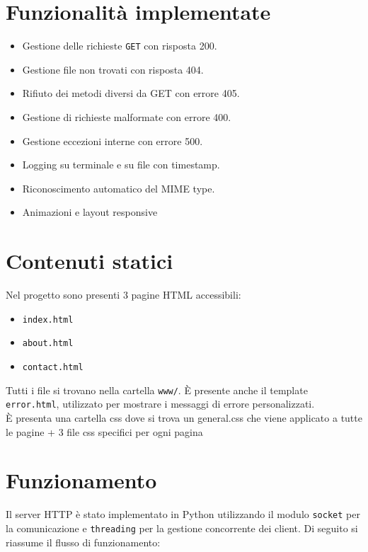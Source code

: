 \documentclass[a4paper,11pt]{article}
\begin{document}
\section*{Funzionalità implementate}
\begin{itemize}
  \item Gestione delle richieste \texttt{GET} con risposta 200.
  \item Gestione file non trovati con risposta 404.
  \item Rifiuto dei metodi diversi da GET con errore 405.
  \item Gestione di richieste malformate con errore 400.
  \item Gestione eccezioni interne con errore 500.
  \item Logging su terminale e su file con timestamp.
  \item Riconoscimento automatico del MIME type.
  \item Animazioni e layout responsive
\end{itemize}

\section*{Contenuti statici}
Nel progetto sono presenti 3 pagine HTML accessibili:
\begin{itemize}
  \item \texttt{index.html}
  \item \texttt{about.html}
  \item \texttt{contact.html}
\end{itemize}
Tutti i file si trovano nella cartella \texttt{www/}. È presente anche il template \texttt{error.html}, utilizzato per mostrare i messaggi di errore personalizzati.
\\È presenta una cartella css dove si trova un general.css che viene applicato a tutte le pagine + 3 file css specifici per ogni pagina

\section*{Funzionamento}

Il server HTTP è stato implementato in Python utilizzando il modulo \texttt{socket} per la comunicazione e \texttt{threading} per la gestione concorrente dei client. Di seguito si riassume il flusso di funzionamento:
\end{document}
